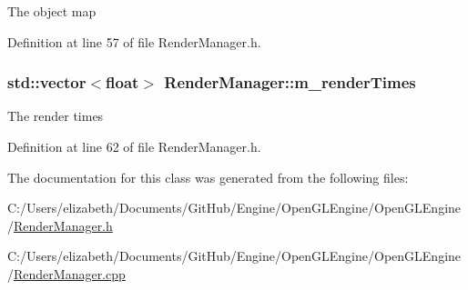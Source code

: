 The object map 



Definition at line 57 of file Render\+Manager.\+h.

\subsubsection[{\texorpdfstring{m\+\_\+render\+Times}{m_renderTimes}}]{\setlength{\rightskip}{0pt plus 5cm}std\+::vector$<$float$>$ Render\+Manager\+::m\+\_\+render\+Times\hspace{0.3cm}{\ttfamily [private]}}\hypertarget{class_render_manager_abf893ed7a6aee1bc406bd1acbcbb27e6}{}\label{class_render_manager_abf893ed7a6aee1bc406bd1acbcbb27e6}


The render times 



Definition at line 62 of file Render\+Manager.\+h.



The documentation for this class was generated from the following files\+:\begin{DoxyCompactItemize}
\item 
C\+:/\+Users/elizabeth/\+Documents/\+Git\+Hub/\+Engine/\+Open\+G\+L\+Engine/\+Open\+G\+L\+Engine/\hyperlink{_render_manager_8h}{Render\+Manager.\+h}\item 
C\+:/\+Users/elizabeth/\+Documents/\+Git\+Hub/\+Engine/\+Open\+G\+L\+Engine/\+Open\+G\+L\+Engine/\hyperlink{_render_manager_8cpp}{Render\+Manager.\+cpp}\end{DoxyCompactItemize}
